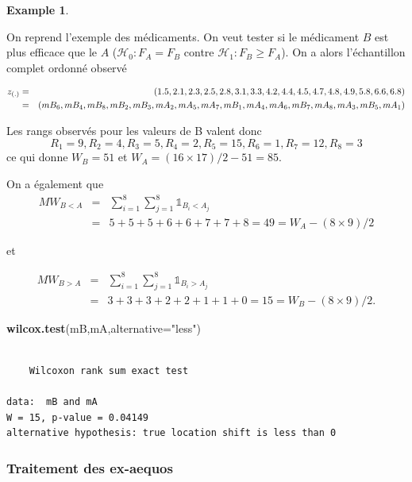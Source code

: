 \documentclass[
]{book}
\newenvironment{Shaded}{\begin{snugshade}}{\end{snugshade}}
\newcommand{\DataTypeTok}[1]{\textcolor[rgb]{0.13,0.29,0.53}{#1}}
\newcommand{\KeywordTok}[1]{\textcolor[rgb]{0.13,0.29,0.53}{\textbf{#1}}}
\newcommand{\NormalTok}[1]{#1}
\newcommand{\StringTok}[1]{\textcolor[rgb]{0.31,0.60,0.02}{#1}}
\theoremstyle{definition}
\theoremstyle{definition}
\newtheorem{example}{Example}[chapter]
\theoremstyle{definition}
\theoremstyle{definition}
\theoremstyle{remark}
\begin{document}
\begin{example}
\protect\hypertarget{exm:unlabeled-div-34}{}\label{exm:unlabeled-div-34}

On reprend l'exemple des médicaments. On veut tester si le médicament \(B\) est plus efficace que le \(A\) (\(\mathcal{H}_0: F_A=F_B\) contre \(\mathcal{H}_1: F_B \geq F_A\)). On a alors l'échantillon complet ordonné observé

\begin{eqnarray*}
z_{(.)} &=& (1.5, 2.1, 2.3, 2.5, 2.8, 3.1, 3.3, 4.2, 4.4, 4.5, 4.7, 4.8, 4.9, 5.8, 6.6, 6.8)\\
& = & {\scriptsize (mB_6, mB_4, mB_8, mB_2, mB_3, mA_2,mA_5,mA_7,mB_1,mA_4,mA_6,mB_7,mA_8,mA_3,mB_5,mA_1)}
\end{eqnarray*}

Les rangs observés pour les valeurs de B valent donc
\[R_1=9,R_2=4,R_3=5,R_4=2,R_5=15,R_6=1, R_7=12, R_8=3\]
ce qui donne \(W_B=51\) et \(W_A=(16\times 17)/2 - 51 = 85\).

On a également que
\begin{eqnarray*}
MW_{B<A}&=&\sum_{i=1}^8\sum_{j=1}^8 \mathbb{1}_{B_i < A_j}\\ 
&=& 5+ 5+5+6+6+7+7+8 = 49 = W_A - (8 \times 9) /2
\end{eqnarray*}

et

\begin{eqnarray*}
MW_{B>A} &=& \sum_{i=1}^8\sum_{j=1}^8 \mathbb{1}_{B_i > A_j} \\
&=& 3+3+3+2+2+1+1+0=15 = W_B - (8 \times 9) /2. 
\end{eqnarray*}

\begin{Shaded}
\begin{Highlighting}[]
\KeywordTok{wilcox.test}\NormalTok{(mB,mA,}\DataTypeTok{alternative=}\StringTok{"less"}\NormalTok{)}
\end{Highlighting}
\end{Shaded}

\begin{verbatim}

    Wilcoxon rank sum exact test

data:  mB and mA
W = 15, p-value = 0.04149
alternative hypothesis: true location shift is less than 0
\end{verbatim}

\end{example}

\hypertarget{subexaequo}{%
\subsubsection{Traitement des ex-aequos}\label{subexaequo}}
\end{document}
